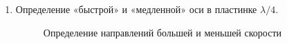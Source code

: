 \begin{enumerate}
    \item Определение «быстрой» и «медленной» оси в пластинке $\lambda / 4$. 
    \begin{figure}[h!]
        \noindent{}
        \caption{Определение направлений большей и меньшей скорости}
    \end{figure} 
    
\end{enumerate}